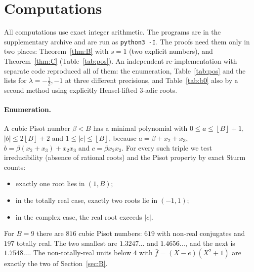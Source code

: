 \documentclass[11pt,a4paper]{article}
\theoremstyle{definition}
\theoremstyle{remark}
\newcommand{\floor}[1]{\left\lfloor #1\right\rfloor}
\begin{document}
\section{Computations}\label{sec:comp}

All computations use exact integer arithmetic. The programs are in the supplementary archive and are run as \texttt{python3 -I}.
The proofs need them only in two places: Theorem~\ref{thm:B} with $s=1$ (two explicit numbers), and Theorem~\ref{thm:C} (Table~\ref{tab:pos}).
An independent re-implementation with separate code reproduced all of them: the enumeration, Table~\ref{tab:pos} and the lists for $\lambda=-\frac12,-1$ at three different precisions, and Table~\ref{tab:b0} also by a second method using explicitly Hensel-lifted $3$-adic roots.

\paragraph{Enumeration.}
A cubic Pisot number $\beta<B$ has a minimal polynomial with $0\le a\le\floor B+1$, $|b|\le2\floor B+2$ and $1\le|c|\le\floor B$, because $a=\beta+x_2+x_3$, $b=\beta(x_2+x_3)+x_2x_3$ and $c=\beta x_2x_3$.
For every such triple we test irreducibility (absence of rational roots) and the Pisot property by exact Sturm counts:
\begin{itemize}
\item exactly one root lies in $(1,B)$;
\item in the totally real case, exactly two roots lie in $(-1,1)$;
\item in the complex case, the real root exceeds $|c|$.
\end{itemize}
For $B=9$ there are $816$ cubic Pisot numbers: $619$ with non-real conjugates and $197$ totally real.
The two smallest are $1.3247\ldots$ and $1.4656\ldots$, and the next is $1.7548\ldots$.
The non-totally-real units below $4$ with $\bar f=(X-e)(X^2+1)$ are exactly the two of Section~\ref{sec:B}.
\end{document}
